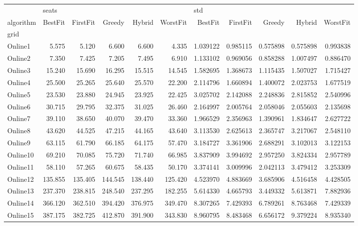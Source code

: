 \begin{tabular}{lrrrrrrrrrr}
\toprule
{} & \multicolumn{5}{l}{seats} & \multicolumn{5}{l}{std} \\
algorithm &  BestFit & FirstFit &   Greedy &   Hybrid & WorstFit &   BestFit &  FirstFit &    Greedy &    Hybrid &  WorstFit \\
grid     &          &          &          &          &          &           &           &           &           &           \\
\midrule
Online1  &    5.575 &    5.120 &    6.600 &    6.600 &    4.335 &  1.039122 &  0.985115 &  0.575898 &  0.575898 &  0.993838 \\
Online2  &    7.350 &    7.425 &    7.205 &    7.495 &    6.910 &  1.133102 &  0.969056 &  0.858288 &  1.007497 &  0.886470 \\
Online3  &   15.240 &   15.690 &   16.295 &   15.515 &   14.545 &  1.582695 &  1.368673 &  1.115435 &  1.507027 &  1.715427 \\
Online4  &   25.500 &   25.265 &   25.640 &   25.570 &   22.200 &  2.114796 &  1.660894 &  1.400072 &  2.023753 &  1.677519 \\
Online5  &   23.530 &   23.880 &   24.945 &   23.925 &   22.425 &  3.025702 &  2.142088 &  2.248836 &  2.815852 &  2.540996 \\
Online6  &   30.715 &   29.795 &   32.375 &   31.025 &   26.460 &  2.164997 &  2.005764 &  2.058046 &  2.055603 &  2.135698 \\
Online7  &   39.110 &   38.650 &   40.070 &   39.470 &   33.360 &  1.966529 &  2.356963 &  1.390961 &  1.834647 &  2.627722 \\
Online8  &   43.620 &   44.525 &   47.215 &   44.165 &   43.640 &  3.113530 &  2.625613 &  2.365747 &  3.217067 &  2.548110 \\
Online9  &   63.115 &   61.790 &   66.185 &   64.175 &   57.470 &  3.184727 &  3.361906 &  2.688291 &  3.102013 &  3.122153 \\
Online10 &   69.210 &   70.085 &   75.720 &   71.740 &   66.985 &  3.837909 &  3.994692 &  2.957250 &  3.824334 &  2.957789 \\
Online11 &   58.110 &   57.265 &   60.675 &   58.435 &   50.170 &  3.374141 &  3.009996 &  2.042113 &  3.479412 &  3.253309 \\
Online12 &  135.855 &  135.405 &  144.545 &  138.440 &  125.420 &  4.523970 &  4.883669 &  3.685906 &  4.516458 &  4.428505 \\
Online13 &  237.370 &  238.815 &  248.540 &  237.295 &  182.255 &  5.614330 &  4.665793 &  3.449332 &  5.613871 &  7.882936 \\
Online14 &  366.120 &  362.510 &  394.420 &  376.975 &  349.470 &  8.307265 &  7.429393 &  6.789261 &  8.763468 &  7.429339 \\
Online15 &  387.175 &  382.725 &  412.870 &  391.900 &  343.830 &  8.960795 &  8.483468 &  6.656172 &  9.379224 &  8.935340 \\
\bottomrule
\end{tabular}

